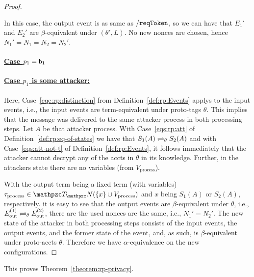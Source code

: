 \begin{proof}
\begin{itemize}
        In this case, the output event is as same as $\mathtt{/reqToken}$, 
        so we can have that $E_1'$ and $E_2'$ are $\beta$-equivalent under $(\theta\prime, L)$.
        No new nonces are chosen, hence $N_1\prime=N_1=N_2=N_2\prime$.
    \end{itemize}

    \paragraph{\underline{Case $p_1 = \mathsf{b_1}$}}
  
    \paragraph{\underline{Case $p_1$ is some attacker:}}
    
    Here, Case~\ref{eqe:rp:distinction} from 
    Definition~\ref{def:rp:Events} applys to the input events,
    i.e., the input events are term-equivalent under proto-tags
    $\theta$. This implies that the message was delivered to the 
    same attacker process in both processing steps. Let $A$ be 
    that attacker process. With Case~\ref{eqs:rp:att} of 
    Definition~\ref{def:rp:eq-of-states} we have that 
    $S_1(A) \rightleftharpoons_{\theta} S_2(A)$ and with 
    Case~\ref{eqs:att-not-t} of Definition~\ref{def:rp:Events},  
    it follows immediately that the attacker cannot decrypt any 
    of the accts in $\theta$ in its knowledge. Further, in the 
    attackers state there are no variables (from $V_\text{process}$). 
  
    With the output term being a fixed term (with variables)
    $\tau_{\text{process}} \in \terms(\{x\} \cup V_\text{process})$ 
    and $x$ being $S_1(A)$ or $S_2(A)$, respectively. 
    it is easy to see that the output events are 
    $\beta$-equivalent under $\theta$, i.e., 
    $E ^{(1)}_\text{out} \rightleftharpoons_{\theta} E^{(2)}_\text{out}$, there
    are the used nonces are the same, i.e., $N_1' = N_2'$. 
    The new state of the attacker in both processing steps 
    consists of the input events, the output events, and the 
    former state of the event, and, as such, is 
    $\beta$-equivalent under proto-accts $\theta$. 
    Therefore we have $\alpha$-equivalence on the new configurations.
  \end{proof}
  
  This proves Theorem~\ref{theorem:rp-privacy}.\QED
  
  
  